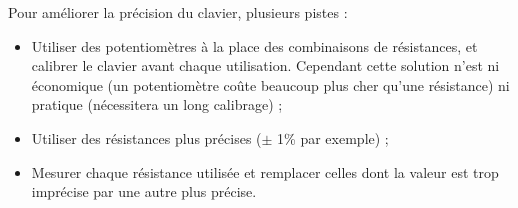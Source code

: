 Pour améliorer la précision du clavier, plusieurs pistes :
\begin{itemize}
	\item Utiliser des potentiomètres à la place des combinaisons
	de résistances, et calibrer le clavier avant chaque utilisation.
	Cependant cette solution n'est ni économique (un potentiomètre
	coûte beaucoup plus cher qu'une résistance) ni pratique (nécessitera
	un long calibrage) ;
	\item Utiliser des résistances plus précises ($\pm$ 1\% par exemple) ;
	\item Mesurer chaque résistance utilisée et remplacer celles dont la
	valeur est trop imprécise par une autre plus précise.
\end{itemize}